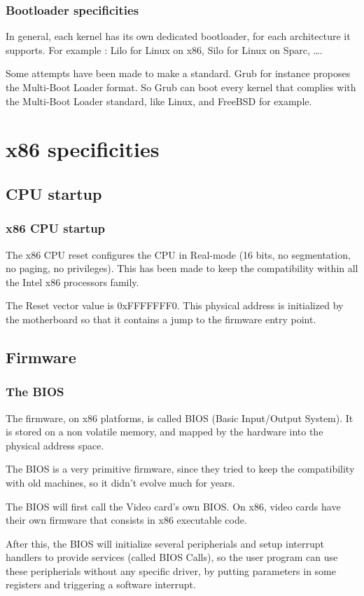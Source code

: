 \begin{frame}
  \frametitle{Bootloader specificities}

  In general, each kernel has its own dedicated bootloader, for each architecture it supports. For example : Lilo for Linux on x86, Silo for Linux on Sparc, \ldots.

  \-

  Some attempts have been made to make a standard. Grub for instance proposes the Multi-Boot Loader format. So Grub can boot every kernel that complies with the Multi-Boot Loader standard, like Linux, and FreeBSD for example.

\end{frame}

\section{x86 specificities}
\subsection{CPU startup}

\begin{frame}
  \frametitle{x86 CPU startup}

  The x86 CPU reset configures the CPU in Real-mode (16 bits, no segmentation, no paging, no privileges). This has been made to keep the compatibility within all the Intel x86 processors family.

  \- 

  The Reset vector value is 0xFFFFFFF0. This physical address is initialized by the motherboard so that it contains a jump to the firmware entry point.

\end{frame}

\subsection{Firmware}

\begin{frame}
  \frametitle{The BIOS}

  The firmware, on x86 platforms, is called BIOS (Basic Input/Output System). It is stored on a non volatile memory, and mapped by the hardware into the physical address space.

  \-

  The BIOS is a very primitive firmware, since they tried to keep the compatibility with old machines, so it didn't evolve much for years.

  \-

  The BIOS will first call the Video card's own BIOS. On x86, video cards have their own firmware that consists in x86 executable code.

  \-

  After this, the BIOS will initialize several peripherials and setup interrupt handlers to provide services (called BIOS Calls), so the user program can use these peripherials without any specific driver, by putting parameters in some registers and triggering a software interrupt.

\end{frame}

